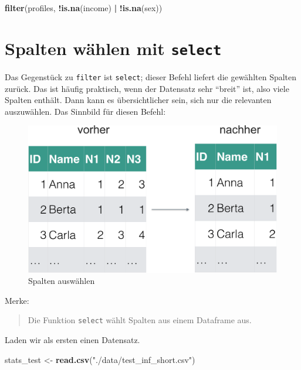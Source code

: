\documentclass[12pt,ngerman,paper=a4,pagesize,DIV=13]{scrreprt}
\newenvironment{Shaded}{\begin{snugshade}}{\end{snugshade}}
\newcommand{\KeywordTok}[1]{\textcolor[rgb]{0.13,0.29,0.53}{\textbf{#1}}}
\newcommand{\NormalTok}[1]{#1}
\newcommand{\OperatorTok}[1]{\textcolor[rgb]{0.81,0.36,0.00}{\textbf{#1}}}
\newcommand{\StringTok}[1]{\textcolor[rgb]{0.31,0.60,0.02}{#1}}
\begin{document}
\begin{Shaded}
\begin{Highlighting}[]
\KeywordTok{filter}\NormalTok{(profiles, }\OperatorTok{!}\KeywordTok{is.na}\NormalTok{(income) }\OperatorTok{|}\StringTok{ }\OperatorTok{!}\KeywordTok{is.na}\NormalTok{(sex))}
\end{Highlighting}
\end{Shaded}

\hypertarget{spalten-wahlen-mit-select}{%
\section{\texorpdfstring{Spalten wählen mit
\texttt{select}}{Spalten wählen mit select}}\label{spalten-wahlen-mit-select}}

Das Gegenstück zu \texttt{filter} ist \texttt{select}; dieser Befehl
liefert die gewählten Spalten zurück. Das ist häufig praktisch, wenn der
Datensatz sehr \enquote{breit} ist, also viele Spalten enthält. Dann
kann es übersichtlicher sein, sich nur die relevanten auszuwählen. Das
Sinnbild für diesen Befehl:

\begin{figure}

{\centering \includegraphics[width=0.6\linewidth]{Inhalte/images/Datenjudo/select} 

}

\caption{Spalten auswählen}\label{fig:fig-select}
\end{figure}

Merke:

\begin{quote}
Die Funktion \texttt{select} wählt Spalten aus einem Dataframe aus.
\end{quote}

Laden wir als ersten einen Datensatz.

\begin{Shaded}
\begin{Highlighting}[]
\NormalTok{stats_test <-}\StringTok{ }\KeywordTok{read.csv}\NormalTok{(}\StringTok{"./data/test_inf_short.csv"}\NormalTok{)}
\end{Highlighting}
\end{Shaded}
\end{document}
